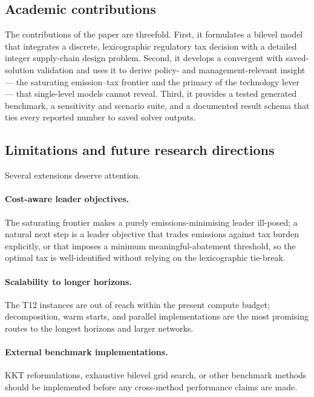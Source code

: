 \subsection{Academic contributions}
\label{sec:conc:contributions}

The contributions of the paper are threefold. First, it formulates a
bilevel \CLSC model that integrates a discrete, lexicographic
regulatory tax decision with a detailed integer supply-chain design
problem. Second, it develops a convergent \DBP with saved-solution
validation and uses it to derive policy- and management-relevant
insight --- the saturating emission--tax frontier and the primacy of
the technology lever --- that single-level models cannot reveal.
Third, it provides a tested generated benchmark, a sensitivity and
scenario suite, and a documented result schema that ties every
reported number to saved solver outputs.

\subsection{Limitations and future research directions}
\label{sec:conc:future}

Several extensions deserve attention.

\paragraph{Cost-aware leader objectives.}
The saturating frontier makes a purely emissions-minimising leader
ill-posed; a natural next step is a leader objective that trades
emissions against tax burden explicitly, or that imposes a minimum
meaningful-abatement threshold, so the optimal tax is well-identified
without relying on the lexicographic tie-break.

\paragraph{Scalability to longer horizons.}
The T12 instances are out of reach within the present compute budget;
decomposition, warm starts, and parallel \DBP implementations are the
most promising routes to the longest horizons and larger networks.

\paragraph{External benchmark implementations.}
KKT reformulations, exhaustive bilevel grid search, or other
benchmark methods should be implemented before any cross-method
performance claims are made.

